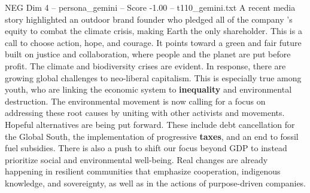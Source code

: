 \begin{textsample}{NEG Dim 4 – persona\_gemini – Score -1.00 – t110\_gemini.txt}  \label{ex:f4_neg_013}
A recent media story highlighted an outdoor brand founder who pledged all of the company 's equity to combat the climate crisis, making Earth the only shareholder.
This is a call to choose action, hope, and courage.
It points toward a green and fair future built on justice and collaboration, where people and the planet are put before profit.
The climate and biodiversity crises are evident.
In response, there are growing global challenges to neo-liberal capitalism.
This is especially true among youth, who are linking the economic system to \textbf{inequality} and environmental destruction.
The environmental movement is now calling for a focus on addressing these root causes by uniting with other activists and movements.
Hopeful alternatives are being put forward.
These include debt cancellation for the Global South, the implementation of progressive \textbf{taxes}, and an end to fossil fuel subsidies.
There is also a push to shift our focus beyond GDP to instead prioritize social and environmental well-being.
Real changes are already happening in resilient communities that emphasize cooperation, indigenous knowledge, and sovereignty, as well as in the actions of purpose-driven companies.

\end{textsample}
